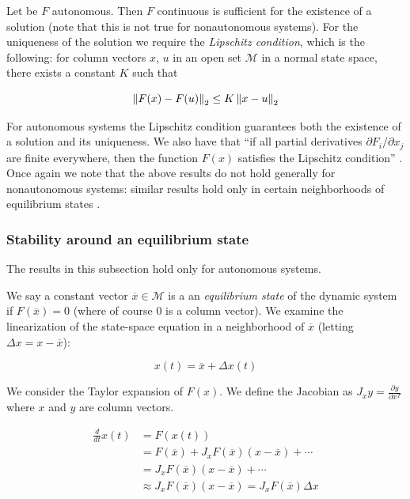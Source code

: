 Let be $F$ autonomous. Then $F$ continuous is sufficient for the existence of a solution (note that this is not true for nonautonomous systems). For the uniqueness of the solution we require the \emph{Lipschitz condition}, which is the following: for column vectors $x$, $u$ in an open set $\mathcal{M}$ in a normal state space, there exists a constant $K$ such that

\begin{equation*}
\left\lVert F(x) - F(u) \right\rVert_2 \leq K\left\lVert x - u \right\rVert_2
\end{equation*}

For autonomous systems the Lipschitz condition guarantees both the existence of a solution and its uniqueness. We also have that ``if all partial derivatives $\partial F_i / \partial x_j$ are finite everywhere, then the function $F(x)$ satisfies the Lipschitz condition'' \cite[p. 677]{Haykin:2009:NNC:1213811}. Once again we note that the above results do not hold generally for nonautonomous systems: similar results hold only in certain neighborhoods of equilibrium states \cite[Definition A.2, p. 194]{rasmussen2006attractivity}.

\subsubsection{Stability around an equilibrium state}

The results in this subsection hold only for autonomous systems.

We say a constant vector $\overline{x} \in \mathcal{M}$ is a an \emph{equilibrium state} of the dynamic system if $F(\overline{x}) = 0$ (where of course 0 is a column vector). We examine the linearization of the state-space equation in a neighborhood of $\overline{x}$ (letting $\Delta x = x - \overline{x}$):

\begin{equation*}
x(t) = \overline{x} + \Delta x(t)
\end{equation*}

We consider the Taylor expansion of $F(x)$. We define the Jacobian as $J_xy = \frac{\partial y}{\partial x^T}$ where $x$ and $y$ are column vectors.

\begin{align*}
  \frac{d}{dt}x(t) & = F(x(t)) \\
  & = F(\overline{x}) + J_x F(\overline{x})(x - \overline{x}) + \cdots \\
  & = J_x F(\overline{x})(x - \overline{x}) + \cdots \\
  & \approx J_x F(\overline{x})(x - \overline{x}) = J_x F(\overline{x}) \Delta x
\end{align*}
%


